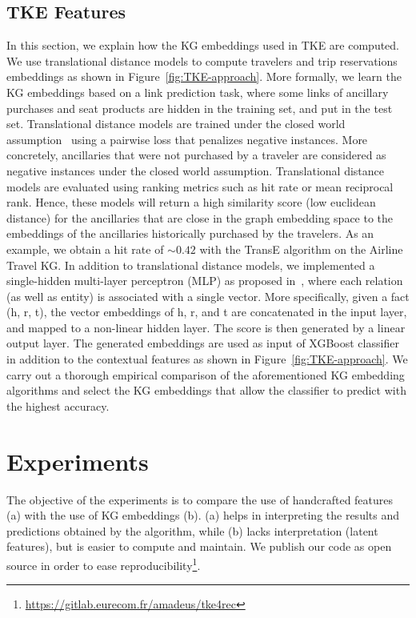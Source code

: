 \documentclass[11pt,dvipdfm]{article}
\begin{document}
\subsection{TKE Features}
\label{subsec:embeddings}
In this section, we explain how the KG embeddings used in TKE are computed. We use translational distance models to compute travelers and trip reservations embeddings as shown in Figure~\ref{fig:TKE-approach}. More formally, we learn the KG embeddings based on a link prediction task, where some links of ancillary purchases and seat products are hidden in the training set, and put in the test set. Translational distance models are trained under the closed world assumption~\cite{Wang18} using a pairwise loss that penalizes negative instances. More concretely, ancillaries that were not purchased by a traveler are considered as negative instances under the closed world assumption. Translational distance models are evaluated using ranking metrics such as hit rate or mean reciprocal rank. Hence, these models will return a high similarity score (low euclidean distance) for the ancillaries that are close in the graph embedding space to the embeddings of the ancillaries historically purchased by the travelers. As an example, we obtain a hit rate of $\sim 0.42$ with the TransE algorithm on the Airline Travel KG. In addition to translational distance models, we implemented a single-hidden multi-layer perceptron (MLP) as proposed in~\cite{Xin14}, where each relation (as well as entity) is associated with a single vector. More specifically, given a fact (h, r, t), the vector embeddings of h, r, and t are concatenated in the input layer, and mapped to a non-linear hidden layer. The score is then generated by a linear output layer. The generated embeddings are used as input of XGBoost classifier in addition to the contextual features as shown in Figure~\ref{fig:TKE-approach}. We carry out a thorough empirical comparison of the aforementioned KG embedding algorithms and select the KG embeddings that allow the classifier to predict with the highest accuracy.

\section{Experiments}
\label{sec:experiments}
The objective of the experiments is to compare the use of handcrafted features (a) with the use of KG embeddings (b). (a) helps in interpreting the results and predictions obtained by the algorithm, while (b) lacks interpretation (latent features), but is easier to compute and maintain. We publish our code as open source in order to ease reproducibility\footnote{\url{https://gitlab.eurecom.fr/amadeus/tke4rec}}.
\end{document}
